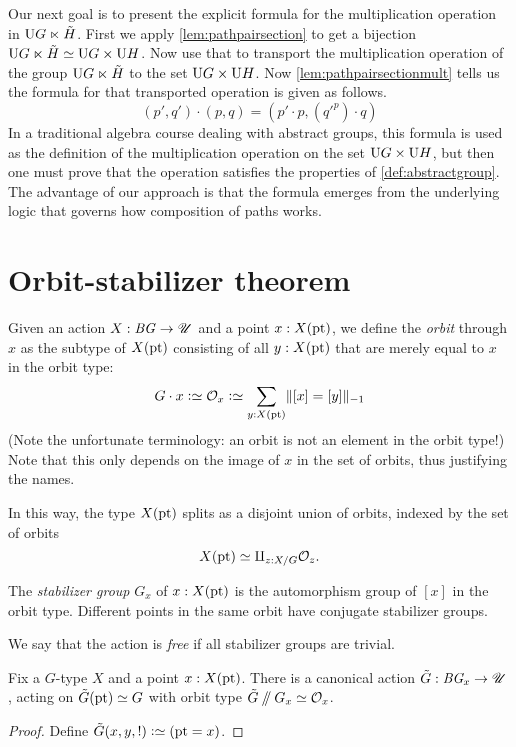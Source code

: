 Our next goal is to present the explicit formula for the multiplication operation in $\mathrm{U} { G \ltimes \tilde H }$.
First we apply \cref{lem:pathpairsection} to get a bijection $\mathrm{U} { G \ltimes \tilde H } \simeq \mathrm{U} G \times \mathrm{U} H$.
Now use that to transport the multiplication operation of the group $\mathrm{U} { G \ltimes \tilde H }$ to the set $\mathrm{U} G \times \mathrm{U} H$.
Now \cref{lem:pathpairsectionmult} tells us the formula for that transported operation is given as follows.
$$ (p',q') \cdot (p,q) = (p' \cdot p , ({q'} ^ p) \cdot q) $$
In a traditional algebra course dealing with abstract groups, this formula is used as the definition of the multiplication operation
on the set $\mathrm{U} G \times \mathrm{U} H$, but then one must prove that the operation satisfies the properties of \cref{def:abstractgroup}.
The advantage of our approach is that the formula emerges from the underlying logic that governs how composition of paths works.

\section{Orbit-stabilizer theorem}
\label{sec:orbit-stabilizer-theorem}

Given an action $X : \mathit{B}\mathit{G} \to {\mathscr{U}}$ and a point $x : X(\mathrm{pt})$, we define
the \emph{orbit} through $x$ as the subtype of $X(\mathrm{pt})$ consisting of
all $y : X(\mathrm{pt})$ that are merely equal to $x$ in the orbit type:
\[
  G\cdot x \defeq \mathcal O_x \defeq \sum_{y : X(\pt)} \merely{[x] = [y]}
\]
(Note the unfortunate terminology: an orbit is not an element in the
orbit type!)
Note that this only depends on the image of $x$ in the set of orbits,
thus justifying the names.

In this way, the type $X(\mathrm{pt})$ splits as a disjoint union of orbits,
indexed by the set of orbits
\[
  X(\mathrm{pt}) \simeq \amalg_{z : X / G} \mathcal O_z.
\]

The \emph{stabilizer group} $G_x$ of $x : X(\mathrm{pt})$ is the automorphism group of $[x]$ in the orbit type.
Different points in the same orbit have conjugate stabilizer groups.

We say that the action is \emph{free} if all stabilizer groups are trivial.

\begin{theorem}
  \label{thm:orbitstab}
  Fix a $G$-type $X$ and a point $x : X(\mathrm{pt})$.
  There is a canonical action $\tilde G : \mathit{B}\mathit{G}_x \to {\mathscr{U}}$,
  acting on $\tilde G(\mathrm{pt})\simeq G$
  with orbit type $\tilde G\mathbin{/\kern-3pt/} G_x \simeq \mathcal O_x$.
\end{theorem}
\begin{proof}
  Define $\tilde G(x,y,!) \defeq (\pt = x)$.
\end{proof}

